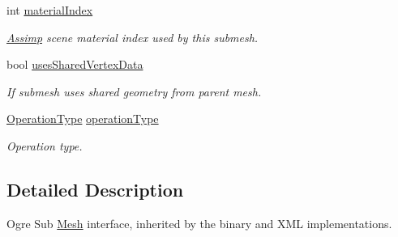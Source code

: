 \begin{DoxyCompactItemize}
\item 
int \hyperlink{class_assimp_1_1_ogre_1_1_i_sub_mesh_acc993afc867ac7a287e423a8adf0ce49}{material\+Index}
\begin{DoxyCompactList}\small\item\em \hyperlink{class_assimp}{Assimp} scene material index used by this submesh. \end{DoxyCompactList}\item 
\hypertarget{class_assimp_1_1_ogre_1_1_i_sub_mesh_acb46d8f8d54a99713de54065c55e9423}{bool \hyperlink{class_assimp_1_1_ogre_1_1_i_sub_mesh_acb46d8f8d54a99713de54065c55e9423}{uses\+Shared\+Vertex\+Data}}\label{class_assimp_1_1_ogre_1_1_i_sub_mesh_acb46d8f8d54a99713de54065c55e9423}

\begin{DoxyCompactList}\small\item\em If submesh uses shared geometry from parent mesh. \end{DoxyCompactList}\item 
\hypertarget{class_assimp_1_1_ogre_1_1_i_sub_mesh_ae6a3e035bef267fb1dfe79bbdadaa5ac}{\hyperlink{class_assimp_1_1_ogre_1_1_i_sub_mesh_a430f1cb3dbd9d5043ed751f8810ee0a5}{Operation\+Type} \hyperlink{class_assimp_1_1_ogre_1_1_i_sub_mesh_ae6a3e035bef267fb1dfe79bbdadaa5ac}{operation\+Type}}\label{class_assimp_1_1_ogre_1_1_i_sub_mesh_ae6a3e035bef267fb1dfe79bbdadaa5ac}

\begin{DoxyCompactList}\small\item\em Operation type. \end{DoxyCompactList}\end{DoxyCompactItemize}


\subsection{Detailed Description}
Ogre Sub \hyperlink{class_assimp_1_1_ogre_1_1_mesh}{Mesh} interface, inherited by the binary and X\+M\+L implementations. 

